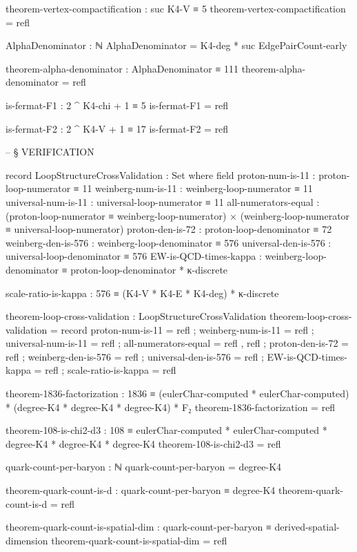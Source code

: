 \documentclass[11pt,a4paper]{book}
\begin{document}
\begin{code}
theorem-vertex-compactification : suc K4-V ≡ 5
theorem-vertex-compactification = refl

AlphaDenominator : ℕ
AlphaDenominator = K4-deg * suc EdgePairCount-early

theorem-alpha-denominator : AlphaDenominator ≡ 111
theorem-alpha-denominator = refl

is-fermat-F1 : 2 ^ K4-chi + 1 ≡ 5
is-fermat-F1 = refl

is-fermat-F2 : 2 ^ K4-V + 1 ≡ 17
is-fermat-F2 = refl



-- § VERIFICATION

record LoopStructureCrossValidation : Set where
  field
    proton-num-is-11   : proton-loop-numerator ≡ 11
    weinberg-num-is-11 : weinberg-loop-numerator ≡ 11
    universal-num-is-11 : universal-loop-numerator ≡ 11
    all-numerators-equal : (proton-loop-numerator ≡ weinberg-loop-numerator) × 
                           (weinberg-loop-numerator ≡ universal-loop-numerator)
    proton-den-is-72   : proton-loop-denominator ≡ 72
    weinberg-den-is-576 : weinberg-loop-denominator ≡ 576
    universal-den-is-576 : universal-loop-denominator ≡ 576
    EW-is-QCD-times-kappa : weinberg-loop-denominator ≡ proton-loop-denominator * κ-discrete
    
    scale-ratio-is-kappa : 576 ≡ (K4-V * K4-E * K4-deg) * κ-discrete

theorem-loop-cross-validation : LoopStructureCrossValidation
theorem-loop-cross-validation = record
  { proton-num-is-11 = refl
  ; weinberg-num-is-11 = refl
  ; universal-num-is-11 = refl
  ; all-numerators-equal = refl , refl
  ; proton-den-is-72 = refl
  ; weinberg-den-is-576 = refl
  ; universal-den-is-576 = refl
  ; EW-is-QCD-times-kappa = refl
  ; scale-ratio-is-kappa = refl
  }

theorem-1836-factorization : 1836 ≡ (eulerChar-computed * eulerChar-computed) * (degree-K4 * degree-K4 * degree-K4) * F₂
theorem-1836-factorization = refl

theorem-108-is-chi2-d3 : 108 ≡ eulerChar-computed * eulerChar-computed * degree-K4 * degree-K4 * degree-K4
theorem-108-is-chi2-d3 = refl

quark-count-per-baryon : ℕ
quark-count-per-baryon = degree-K4

theorem-quark-count-is-d : quark-count-per-baryon ≡ degree-K4
theorem-quark-count-is-d = refl

theorem-quark-count-is-spatial-dim : quark-count-per-baryon ≡ derived-spatial-dimension
theorem-quark-count-is-spatial-dim = refl


\end{code}
\end{document}
